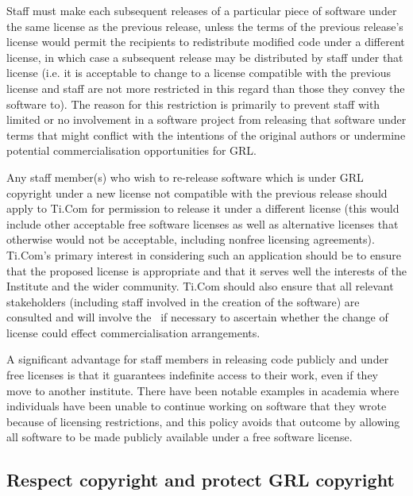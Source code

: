\documentclass[10pt,a4paper]{article}
\begin{document}
\par Staff must make each subsequent releases of a particular piece of software 
under the same license as the previous release, unless the terms of the previous 
release's license would permit the recipients to redistribute modified code under a 
different license, in which case a subsequent release may be distributed by staff 
under that license (i.e. it is acceptable to change to a license compatible with 
the previous license and staff are not more restricted in this regard than those 
they convey the software to). The reason for this restriction is primarily to prevent 
staff with limited or no involvement in a software project from releasing that 
software under terms that might conflict with the intentions of the original 
authors or undermine potential commercialisation opportunities for GRL. 

\par Any staff member(s) who wish to re-release software which is under GRL 
copyright under a new license not compatible with the previous release should 
apply to Ti.Com for permission to release it under a different license (this would 
include other acceptable free software licenses as well as alternative licenses 
that otherwise would not be acceptable, including nonfree licensing 
agreements). Ti.Com's primary interest in considering such an application 
should be to ensure that the proposed license is appropriate and that it serves 
well the interests of the Institute and the wider community. Ti.Com should also 
ensure that all relevant stakeholders (including staff involved in the creation of 
the software) are consulted and will involve the \exectitle\ if necessary to 
ascertain whether the change of license could effect commercialisation 
arrangements. 

\par A significant advantage for staff members in releasing code publicly and 
under free licenses is that it guarantees indefinite access to their work, even 
if they move to another institute. There have been notable examples in 
academia where individuals have been unable to continue working on software 
that they wrote because of licensing restrictions, and this policy avoids that 
outcome by allowing all software to be made publicly available under a free 
software license. 


\subsection{Respect copyright and protect GRL copyright}
\label{section:policy.protection}
\end{document}

